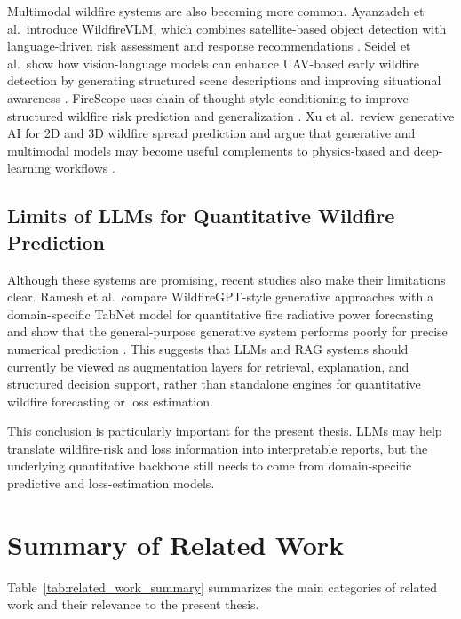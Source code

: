 Multimodal wildfire systems are also becoming more common. Ayanzadeh et al.\ introduce WildfireVLM, which combines satellite-based object detection with language-driven risk assessment and response recommendations \citep{ayanzadeh2026wildfirevlm}. Seidel et al.\ show how vision-language models can enhance UAV-based early wildfire detection by generating structured scene descriptions and improving situational awareness \citep{seidel2025advancing}. FireScope uses chain-of-thought-style conditioning to improve structured wildfire risk prediction and generalization \citep{markov2026firescope}. Xu et al.\ review generative AI for 2D and 3D wildfire spread prediction and argue that generative and multimodal models may become useful complements to physics-based and deep-learning workflows \citep{xu2025generativeai}.

\subsection{Limits of LLMs for Quantitative Wildfire Prediction}

Although these systems are promising, recent studies also make their limitations clear. Ramesh et al.\ compare WildfireGPT-style generative approaches with a domain-specific TabNet model for quantitative fire radiative power forecasting and show that the general-purpose generative system performs poorly for precise numerical prediction \citep{ramesh2025assessingwildfiregpt}. This suggests that LLMs and RAG systems should currently be viewed as augmentation layers for retrieval, explanation, and structured decision support, rather than standalone engines for quantitative wildfire forecasting or loss estimation.

This conclusion is particularly important for the present thesis. LLMs may help translate wildfire-risk and loss information into interpretable reports, but the underlying quantitative backbone still needs to come from domain-specific predictive and loss-estimation models.

\section{Summary of Related Work}

Table~\ref{tab:related_work_summary} summarizes the main categories of related work and their relevance to the present thesis.

